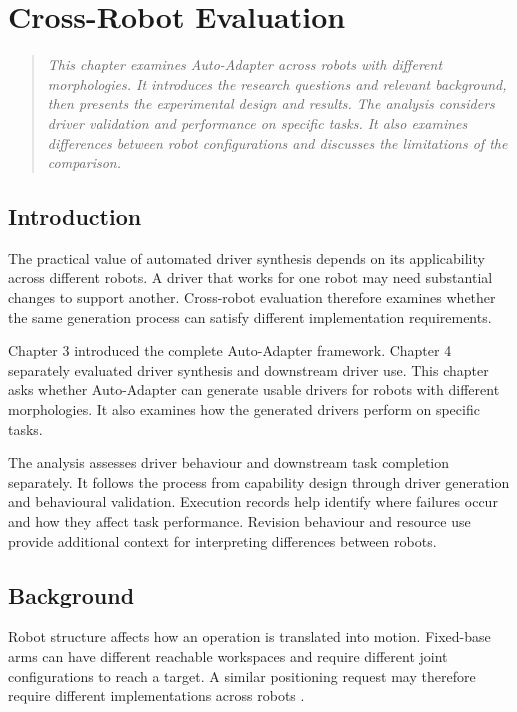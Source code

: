 \chapter[Cross-Robot Evaluation]{Cross-Robot Evaluation}
\label{chapter:cross-robot-evaluation}

\begin{quote}\itshape
This chapter examines Auto-Adapter across robots with different morphologies.
It introduces the research questions and relevant background, then presents the
experimental design and results. The analysis considers driver validation and
performance on specific tasks. It also examines differences between robot
configurations and discusses the limitations of the comparison.
\end{quote}

\section[Introduction]{Introduction}
\label{sec:cross-robot-introduction}

The practical value of automated driver synthesis depends on its applicability
across different robots. A driver that works for one robot may need substantial
changes to support another. Cross-robot evaluation therefore examines whether
the same generation process can satisfy different implementation requirements.

Chapter 3 introduced the complete Auto-Adapter framework. Chapter 4 separately
evaluated driver synthesis and downstream driver use. This chapter asks whether
Auto-Adapter can generate usable drivers for robots with different morphologies.
It also examines how the generated drivers perform on specific tasks.

The analysis assesses driver behaviour and downstream task completion
separately. It follows the process from capability design through driver
generation and behavioural validation. Execution records help identify where
failures occur and how they affect task performance. Revision behaviour and
resource use provide additional context for interpreting differences between
robots.

\section[Background]{Background}
\label{sec:cross-robot-background}

Robot structure affects how an operation is translated into motion. Fixed-base
arms can have different reachable workspaces and require different joint
configurations to reach a target. A similar positioning request may therefore
require different implementations across robots \citep{lynch2017modern}.


